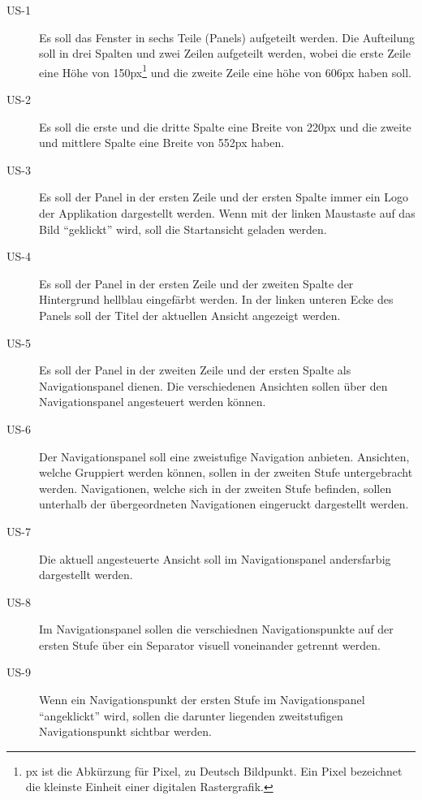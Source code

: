 \begin{description}
\item[US-1\label{itm:US-1}]
Es soll das Fenster in sechs Teile (Panels) aufgeteilt werden. Die Aufteilung
soll in drei Spalten und zwei Zeilen aufgeteilt werden, wobei die erste Zeile
eine Höhe von 150px\footnote{px ist die Abkürzung für Pixel, zu Deutsch
Bildpunkt. Ein Pixel bezeichnet die kleinste Einheit einer digitalen
Rastergrafik.} und die zweite Zeile eine höhe von 606px haben soll.

\item[US-2\label{itm:US-2}]
Es soll die erste und die dritte Spalte eine Breite von 220px und die zweite
und mittlere Spalte eine Breite von 552px haben.

\item[US-3\label{itm:US-3}]
Es soll der Panel in der ersten Zeile und der ersten Spalte immer ein Logo der
Applikation dargestellt werden. Wenn mit der linken Maustaste auf das Bild
``geklickt'' wird, soll die Startansicht geladen werden.

\item[US-4\label{itm:US-4}]
Es soll der Panel in der ersten Zeile und der zweiten Spalte der Hintergrund
hellblau eingefärbt werden. In der linken unteren Ecke des Panels soll der Titel
der aktuellen Ansicht angezeigt werden.

\item[US-5\label{itm:US-5}]
Es soll der Panel in der zweiten Zeile und der ersten Spalte als
Navigationspanel dienen. Die verschiedenen Ansichten sollen über den
Navigationspanel angesteuert werden können.

\item[US-6\label{itm:US-6}]
Der Navigationspanel soll eine zweistufige Navigation anbieten. Ansichten,
welche Gruppiert werden können, sollen in der zweiten Stufe untergebracht
werden. Navigationen, welche sich in der zweiten Stufe befinden, sollen
unterhalb der übergeordneten Navigationen eingeruckt dargestellt werden.

\item[US-7\label{itm:US-7}]
Die aktuell angesteuerte Ansicht soll im Navigationspanel andersfarbig
dargestellt werden.

\item[US-8\label{itm:US-8}]
Im Navigationspanel sollen die verschiednen Navigationspunkte auf der ersten
Stufe über ein Separator visuell voneinander getrennt werden.

\item[US-9\label{itm:US-9}]
Wenn ein Navigationspunkt der ersten Stufe im Navigationspanel ``angeklickt''
wird, sollen die darunter liegenden zweitstufigen Navigationspunkt sichtbar
werden.


\end{description}
